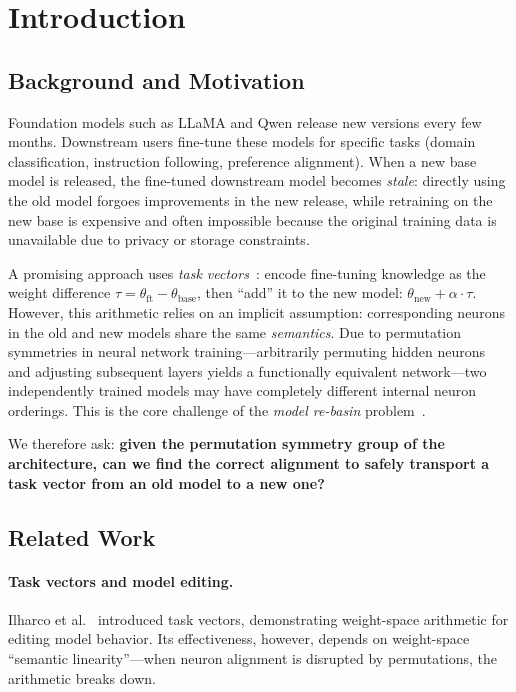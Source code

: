 \section{Introduction}
\label{sec:intro}

\subsection{Background and Motivation}

Foundation models such as LLaMA and Qwen release new versions every few months. Downstream users fine-tune these models for specific tasks (domain classification, instruction following, preference alignment). When a new base model is released, the fine-tuned downstream model becomes \emph{stale}: directly using the old model forgoes improvements in the new release, while retraining on the new base is expensive and often impossible because the original training data is unavailable due to privacy or storage constraints.

A promising approach uses \emph{task vectors}~\cite{Ilharco2023}: encode fine-tuning knowledge as the weight difference $\tau = \theta_{\text{ft}} - \theta_{\text{base}}$, then ``add'' it to the new model: $\theta_{\text{new}} + \alpha\cdot\tau$. However, this arithmetic relies on an implicit assumption: corresponding neurons in the old and new models share the same \emph{semantics}. Due to permutation symmetries in neural network training---arbitrarily permuting hidden neurons and adjusting subsequent layers yields a functionally equivalent network---two independently trained models may have completely different internal neuron orderings. This is the core challenge of the \emph{model re-basin} problem~\cite{Ainsworth2023,Entezari2022}.

We therefore ask: \textbf{given the permutation symmetry group of the architecture, can we find the correct alignment to safely transport a task vector from an old model to a new one?}

\subsection{Related Work}

\paragraph{Task vectors and model editing.} Ilharco et al.~\cite{Ilharco2023} introduced task vectors, demonstrating weight-space arithmetic for editing model behavior. Its effectiveness, however, depends on weight-space ``semantic linearity''---when neuron alignment is disrupted by permutations, the arithmetic breaks down.

